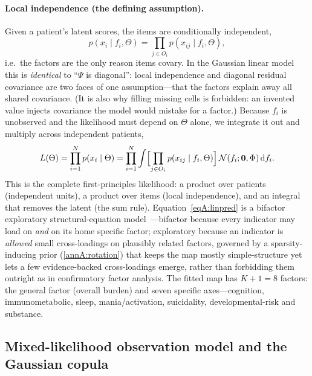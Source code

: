 \paragraph{Local independence (the defining assumption).} Given a patient's latent
scores, the items are conditionally independent,
\begin{equation}
  p(x_i\mid f_i,\Theta)=\prod_{j\in O_i} p(x_{ij}\mid f_i,\Theta),
  \label{eqA:localindep}
\end{equation}
i.e.\ the factors are the only reason items covary. In the Gaussian linear model this
is \emph{identical} to ``$\Psi$ is diagonal'': local independence and diagonal residual
covariance are two faces of one assumption---that the factors explain away all shared
covariance. (It is also why filling missing cells is forbidden: an invented value
injects covariance the model would mistake for a factor.) Because $f_i$ is unobserved
and the likelihood must depend on $\Theta$ alone, we integrate it out and multiply
across independent patients,
\begin{equation}
  L(\Theta)=\prod_{i=1}^{N} p(x_i\mid\Theta)
  =\prod_{i=1}^{N}\int\Bigl[\prod_{j\in O_i} p(x_{ij}\mid f_i,\Theta)\Bigr]\,
  \mathcal{N}(f_i;\mathbf 0,\Phi)\,\mathrm{d}f_i .
  \label{eqA:fulllik}
\end{equation}
This is the complete first-principles likelihood: a product over patients (independent
units), a product over items (local independence), and an integral that removes the
latent (the sum rule). Equation~\eqref{eqA:linpred} is a bifactor exploratory
structural-equation model~\citep{reise2012bifactor,asparouhov2009esem}---bifactor
because every indicator may load on \Gfac{} \emph{and} on its home specific factor;
exploratory because an indicator is \emph{allowed} small cross-loadings on plausibly
related factors, governed by a sparsity-inducing prior (\ref{annA:rotation}) that keeps
the map mostly simple-structure yet lets a few evidence-backed cross-loadings emerge,
rather than forbidding them outright as in confirmatory factor analysis. The fitted map
has $K{+}1=8$ factors: the general factor \Gfac{} (overall burden) and seven specific
axes---cognition, immunometabolic, sleep, mania/activation, suicidality,
developmental-risk and substance.

\subsection{Mixed-likelihood observation model and the Gaussian copula}
\label{annA:mixed}

